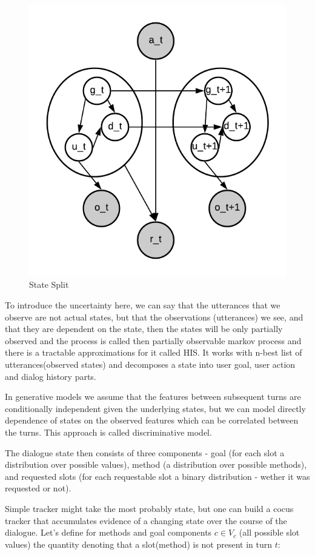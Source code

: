 \documentclass[12pt,titlepage,a4paper]{article}
\begin{document}
\begin{figure}[!htb]
      \includegraphics[width=\linewidth]{state-split.png}
      \caption{State Split}
    \endminipage\hfill
\end{figure}

To introduce the uncertainty here, we can say that the utterances that we observe are not actual states, but that the observations (utterances) we see, and that they are dependent on the state, then the states will be only partially observed and the process is called then partially observable markov process and there is a tractable approximations for it called HIS. It works with n-best list of utterances(observed states) and decomposes a state into user goal, user action and dialog history parts.

In generative models we assume that the features between subsequent turns are conditionally independent given the underlying states, but we can model directly dependence of states on the observed features which can be correlated between the turns. This approach is called discriminative model.

The dialogue state then consists of three components - goal (for each slot a distribution over possible values), method (a distribution over possible methods), and requested slots (for each requestable slot a binary distribution - wether it was requested or not).
\par
Simple tracker might take the most probably state, but one can build a cocus tracker that accumulates evidence of a changing state over the course of the dialogue. Let's define for methods and goal components $c \in V_c$ (all possible slot values) the quantity denoting that a slot(method) is not present in turn $t$:
\end{document}
